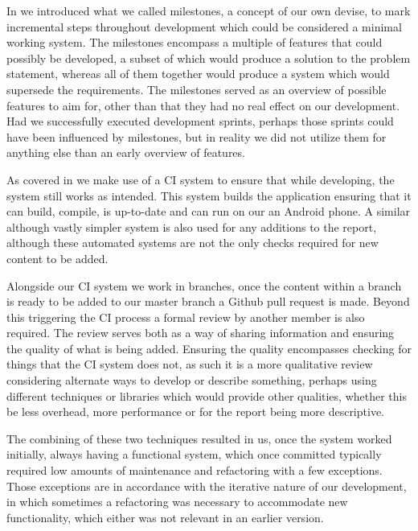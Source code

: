 In  we introduced what we called milestones, a concept of our own devise, to mark incremental steps throughout development which could be considered a minimal working system.
The milestones encompass a multiple of features that could possibly be developed, a subset of which would produce a solution to the problem statement, whereas all of them together would produce a system which would supersede the requirements.
The milestones served as an overview of possible features to aim for, other than that they had no real effect on our development.
Had we successfully executed development sprints, perhaps those sprints could have been influenced by milestones, but in reality we did not utilize them for anything else than an early overview of features.

\bigskip
As covered in  we make use of a \ac{CI} system to ensure that while developing, the system still works as intended.
This system builds the application ensuring that it can build, compile, is up-to-date and can run on our an Android phone.
A similar although vastly simpler system is also used for any additions to the report, although these automated systems are not the only checks required for new content to be added.

Alongside our \ac{CI} system we work in branches, once the content within a branch is ready to be added to our master branch a Github pull request is made.
Beyond this triggering the \ac{CI} process a formal review by another member is also required.
The review serves both as a way of sharing information and ensuring the quality of what is being added.
Ensuring the quality encompasses checking for things that the \ac{CI} system does not, as such it is a more qualitative review considering alternate ways to develop or describe something, perhaps using different techniques or libraries which would provide other qualities, whether this be less overhead, more performance or for the report being more descriptive.

The combining of these two techniques resulted in us, once the system worked initially, always having a functional system, which once committed typically required low amounts of maintenance and refactoring with a few exceptions.
Those exceptions are in accordance with the iterative nature of our development, in which sometimes a refactoring was necessary to accommodate new functionality, which either was not relevant in an earlier version.

